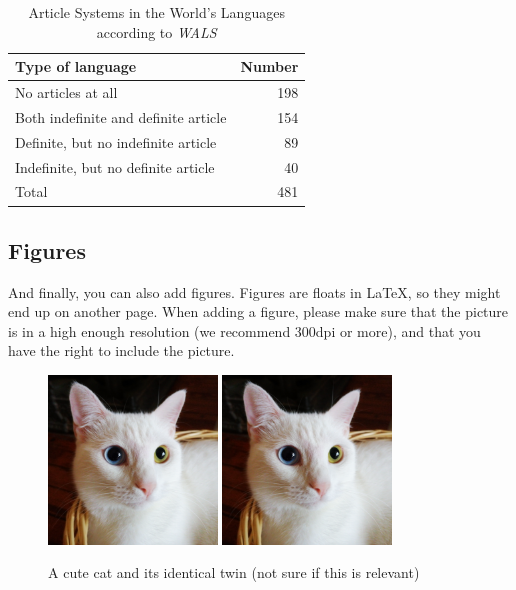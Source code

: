 \begin{table}
 \centering
 \begin{tabular}[t]{lr}
  \toprule
  Type of language                     & Number \\
  \midrule
  No articles at all                   & 198    \\
  Both indefinite and definite article & 154    \\
  Definite, but no indefinite article  & 89     \\
  Indefinite, but no definite article  & 40     \\
  \midrule
  Total                                & 481    \\
  \bottomrule                                       
\end{tabular}
  \caption{Article Systems in the World's Languages according to \emph{WALS}}
  \label{tab:article-systems}
\end{table}

\subsection{Figures}

And finally, you can also add figures. Figures are floats in \LaTeX{}, so they might end up on another page. When adding a figure, please make sure that the picture is in a high enough resolution (we recommend 300dpi or more), and that you have the right to include the picture.

\begin{figure}
    \centering
    \includegraphics[width=0.4\textwidth]{cat.png}
    \includegraphics[width=0.4\textwidth]{cat.png}
    \caption{A cute cat and its identical twin (not sure if this is relevant)}
    \label{fig:my_cat}
\end{figure}

